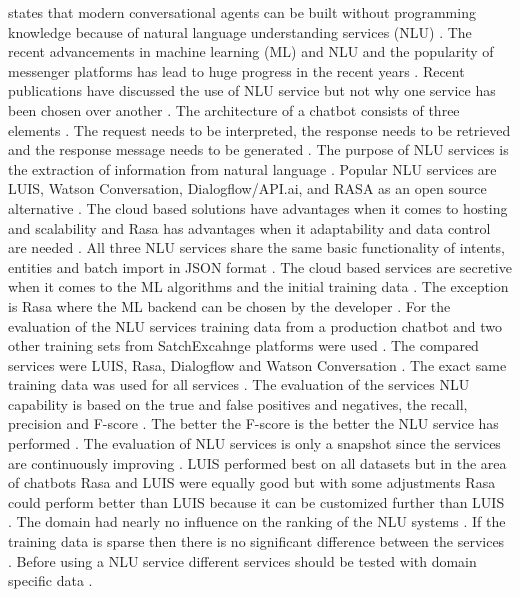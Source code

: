 \documentclass[12pt, backref]{report}
\begin{document}
\citet{braunEvaluatingNLU} states that modern conversational agents can be built without programming knowledge because of natural language understanding services (NLU) \cite{braunEvaluatingNLU}. The recent advancements in machine learning (ML) and NLU and the popularity of messenger platforms has lead to huge progress in the recent years \cite{braunEvaluatingNLU}. Recent publications have discussed the use of NLU service but not why one service has been chosen over another \cite{braunEvaluatingNLU}. The architecture of a chatbot consists of three elements \cite{braunEvaluatingNLU}. The request needs to be interpreted, the response needs to be retrieved and the response message needs to be generated \cite{braunEvaluatingNLU}. The purpose of NLU services is the extraction of information from natural language \cite{braunEvaluatingNLU}. Popular NLU services are LUIS, Watson Conversation, Dialogflow/API.ai, and RASA as an open source alternative \cite{braunEvaluatingNLU}. The cloud based solutions have advantages when it comes to hosting and scalability and Rasa has advantages when it adaptability and data control are needed \cite{braunEvaluatingNLU}. All three NLU services share the same basic functionality of intents, entities and batch import in JSON format \cite{braunEvaluatingNLU}. The cloud based services are secretive when it comes to the ML algorithms and the initial training data \cite{braunEvaluatingNLU}. The exception is Rasa where the ML backend can be chosen by the developer \cite{braunEvaluatingNLU}. For the evaluation of the NLU services training data from a production chatbot and two other training sets from SatchExcahnge platforms were used \cite{braunEvaluatingNLU}. The compared services were LUIS, Rasa, Dialogflow and Watson Conversation \cite{braunEvaluatingNLU}. The exact same training data was used for all services \cite{braunEvaluatingNLU}. The evaluation of the services NLU capability is based on the true and false positives and negatives, the recall, precision and F-score \cite{braunEvaluatingNLU}. The better the F-score is the better the NLU service has performed \cite{braunEvaluatingNLU}. The evaluation of NLU services is only a snapshot since the services are continuously improving \cite{braunEvaluatingNLU}. LUIS performed best on all datasets but in the area of chatbots Rasa and LUIS were equally good but with some adjustments Rasa could perform better than LUIS because it can be customized further than LUIS \cite{braunEvaluatingNLU}. The domain had nearly no influence on the ranking of the NLU systems \cite{braunEvaluatingNLU}.
If the training data is sparse then there is no significant difference between the services \cite{braunEvaluatingNLU}. Before using a NLU service different services should be tested with domain specific data \cite{braunEvaluatingNLU}.
\end{document}

